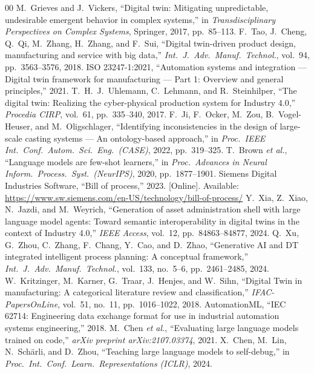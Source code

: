\documentclass[conference]{IEEEtran}
\begin{document}
\begin{thebibliography}{00}
 M.~Grieves and J.~Vickers, ``Digital twin: Mitigating unpredictable, undesirable emergent behavior in complex systems,'' in \textit{Transdisciplinary Perspectives on Complex Systems}, Springer, 2017, pp.~85--113.
 F.~Tao, J.~Cheng, Q.~Qi, M.~Zhang, H.~Zhang, and F.~Sui, ``Digital twin-driven product design, manufacturing and service with big data,'' \textit{Int.\ J.\ Adv.\ Manuf.\ Technol.}, vol.~94, pp.~3563--3576, 2018.
 ISO 23247-1:2021, ``Automation systems and integration --- Digital twin framework for manufacturing --- Part 1: Overview and general principles,'' 2021.
 T.~H.~J.~Uhlemann, C.~Lehmann, and R.~Steinhilper, ``The digital twin: Realizing the cyber-physical production system for Industry 4.0,'' \textit{Procedia CIRP}, vol.~61, pp.~335--340, 2017.
 F.~Ji, F.~Ocker, M.~Zou, B.~Vogel-Heuser, and M.~Oligschlager, ``Identifying inconsistencies in the design of large-scale casting systems --- An ontology-based approach,'' in \textit{Proc.\ IEEE Int.\ Conf.\ Autom.\ Sci.\ Eng.\ (CASE)}, 2022, pp.~319--325.
 T.~Brown \textit{et al.}, ``Language models are few-shot learners,'' in \textit{Proc.\ Advances in Neural Inform.\ Process.\ Syst.\ (NeurIPS)}, 2020, pp.~1877--1901.
 Siemens Digital Industries Software, ``Bill of process,'' 2023. [Online]. Available: \url{https://www.sw.siemens.com/en-US/technology/bill-of-process/}
 Y.~Xia, Z.~Xiao, N.~Jazdi, and M.~Weyrich, ``Generation of asset administration shell with large language model agents: Toward semantic interoperability in digital twins in the context of Industry 4.0,'' \textit{IEEE Access}, vol.~12, pp.~84863--84877, 2024.
 Q.~Xu, G.~Zhou, C.~Zhang, F.~Chang, Y.~Cao, and D.~Zhao, ``Generative AI and DT integrated intelligent process planning: A conceptual framework,'' \textit{Int.\ J.\ Adv.\ Manuf.\ Technol.}, vol.~133, no.~5--6, pp.~2461--2485, 2024.
 W.~Kritzinger, M.~Karner, G.~Traar, J.~Henjes, and W.~Sihn, ``Digital Twin in manufacturing: A categorical literature review and classification,'' \textit{IFAC-PapersOnLine}, vol.~51, no.~11, pp.~1016--1022, 2018.
 AutomationML, ``IEC 62714: Engineering data exchange format for use in industrial automation systems engineering,'' 2018.
 M.~Chen \textit{et al.}, ``Evaluating large language models trained on code,'' \textit{arXiv preprint arXiv:2107.03374}, 2021.
 X.~Chen, M.~Lin, N.~Sch\"arli, and D.~Zhou, ``Teaching large language models to self-debug,'' in \textit{Proc.\ Int.\ Conf.\ Learn.\ Representations (ICLR)}, 2024.

\end{thebibliography}
\end{document}
